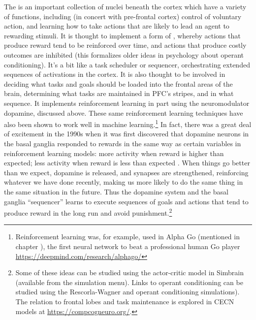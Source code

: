  The  is an important collection of nuclei beneath the cortex which have a variety of functions, including (in concert with pre-frontal cortex) control of voluntary action, and learning how to take actions that are likely to lead an agent to rewarding stimuli. It is thought to implement a form of , whereby actions that produce reward tend to be reinforced over time, and actions that produce costly outcomes are inhibited (this formalizes older ideas in psychology about operant conditioning). It's a bit like a task scheduler or sequencer, orchestrating extended sequences of activations in the cortex. It is also thought to be involved in deciding what tasks and goals should be loaded into the frontal areas of the brain, determining what tasks are maintained in PFC's stripes, and in what sequence. It implements reinforcement learning in part using the neuromodulator dopamine, discussed above. These same reinforcement learning techniques have also been shown to work well in machine learning.\footnote{Reinforcement learning was, for example, used in Alpha Go (mentioned in chapter ), the first neural network to beat a professional human Go player \url{https://deepmind.com/research/alphago/}} In fact, there was a great deal of excitement in the 1990s when it was first discovered that dopamine neurons in the basal ganglia responded to rewards in the same way as certain variables in reinforcement learning models: more activity when reward is higher than expected; less activity when reward is less than expected  \cite{schultz1997neural, niv2009reinforcement}.  When things go better than we expect, dopamine is released, and synapses are strengthened, reinforcing whatever we have done recently, making us more likely to do the same thing in the same situation in the future. Thus the dopamine system and the basal ganglia ``sequencer'' learns to execute sequences of goals and actions that tend to produce reward in the long run and avoid punishment.\footnote{Some of these ideas can be studied using the actor-critic model in Simbrain (available from the simulation menu). Links to operant conditioning can be studied using the Rescorla-Wagner and operant conditioning simulations).  The relation to frontal lobes and task maintenance is explored in CECN models at \url{https://compcogneuro.org/}.}
 
